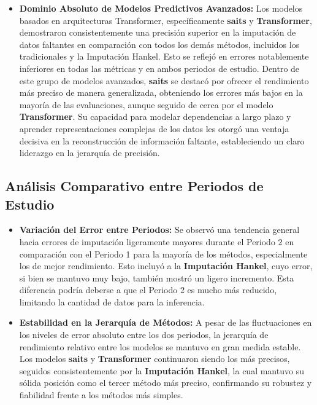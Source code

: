 \begin{itemize}
    \item \textbf{Dominio Absoluto de Modelos Predictivos Avanzados:}
    Los modelos basados en arquitecturas Transformer, específicamente \textbf{\gls{saits}} y \textbf{Transformer}, demostraron consistentemente una precisión superior en la imputación de datos faltantes en comparación con todos los demás métodos, incluidos los tradicionales y la Imputación Hankel. Esto se reflejó en errores notablemente inferiores en todas las métricas y en ambos periodos de estudio. Dentro de este grupo de modelos avanzados, \textbf{\gls{saits}} se destacó por ofrecer el rendimiento más preciso de manera generalizada, obteniendo los errores más bajos en la mayoría de las evaluaciones, aunque seguido de cerca por el modelo \textbf{Transformer}. Su capacidad para modelar dependencias a largo plazo y aprender representaciones complejas de los datos les otorgó una ventaja decisiva en la reconstrucción de información faltante, estableciendo un claro liderazgo en la jerarquía de precisión.
    
\end{itemize}

\subsection*{Análisis Comparativo entre Periodos de Estudio}

\begin{itemize}
    \item \textbf{Variación del Error entre Periodos:} Se observó una tendencia general hacia errores de imputación ligeramente mayores durante el Periodo 2 en comparación con el Periodo 1 para la mayoría de los métodos, especialmente los de mejor rendimiento. Esto incluyó a la \textbf{Imputación Hankel}, cuyo error, si bien se mantuvo muy bajo, también mostró un ligero incremento. Esta diferencia podría deberse a que el Periodo 2 es mucho más reducido, limitando la cantidad de datos para la inferencia.

    \item \textbf{Estabilidad en la Jerarquía de Métodos:} A pesar de las fluctuaciones en los niveles de error absoluto entre los dos periodos, la jerarquía de rendimiento relativo entre los modelos se mantuvo en gran medida estable. Los modelos \textbf{\gls{saits}} y \textbf{Transformer} continuaron siendo los más precisos, seguidos consistentemente por la \textbf{Imputación Hankel}, la cual mantuvo su sólida posición como el tercer método más preciso, confirmando su robustez y fiabilidad frente a los métodos más simples.
\end{itemize}

